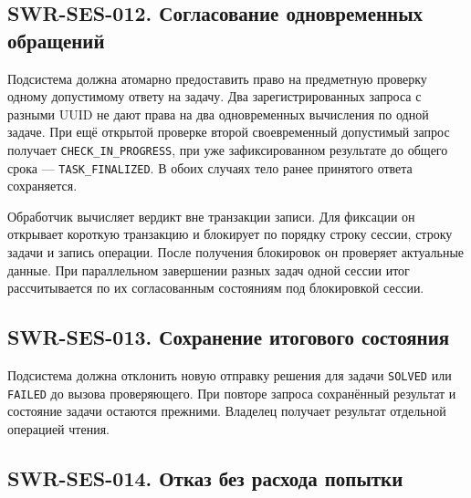 \documentclass[12pt,a4paper]{article}
\begin{document}
\subsection{SWR-SES-012. Согласование одновременных обращений}\label{swr-ses-012-ux441ux43eux433ux43bux430ux441ux43eux432ux430ux43dux438ux435-ux43eux434ux43dux43eux432ux440ux435ux43cux435ux43dux43dux44bux445-ux43eux431ux440ux430ux449ux435ux43dux438ux439}

\hypertarget{swr-ses-012-согласование-одновременных-обращений}{}

\hypertarget{swr-ses-012}{}

Подсистема должна атомарно предоставить право на предметную проверку одному допустимому ответу на задачу. Два зарегистрированных запроса с разными UUID не дают права на два одновременных вычисления по одной задаче. При ещё открытой проверке второй своевременный допустимый запрос получает \texttt{CHECK\_\allowbreak{}IN\_\allowbreak{}PROGRESS}, при уже зафиксированном результате до общего срока --- \texttt{TASK\_\allowbreak{}FINALIZED}. В обоих случаях тело ранее принятого ответа сохраняется.

Обработчик вычисляет вердикт вне транзакции записи. Для фиксации он открывает короткую транзакцию и блокирует по порядку строку сессии, строку задачи и запись операции. После получения блокировок он проверяет актуальные данные. При параллельном завершении разных задач одной сессии итог рассчитывается по их согласованным состояниям под блокировкой сессии.

\subsection{SWR-SES-013. Сохранение итогового состояния}\label{swr-ses-013-ux441ux43eux445ux440ux430ux43dux435ux43dux438ux435-ux438ux442ux43eux433ux43eux432ux43eux433ux43e-ux441ux43eux441ux442ux43eux44fux43dux438ux44f}

\hypertarget{swr-ses-013-сохранение-итогового-состояния}{}

\hypertarget{swr-ses-013}{}

Подсистема должна отклонить новую отправку решения для задачи \texttt{SOLVED} или \texttt{FAILED} до вызова проверяющего. При повторе запроса сохранённый результат и состояние задачи остаются прежними. Владелец получает результат отдельной операцией чтения.

\subsection{SWR-SES-014. Отказ без расхода попытки}\label{swr-ses-014-ux43eux442ux43aux430ux437-ux431ux435ux437-ux440ux430ux441ux445ux43eux434ux430-ux43fux43eux43fux44bux442ux43aux438}
\end{document}
